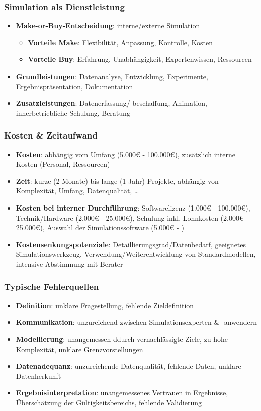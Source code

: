 \documentclass{article}
\begin{document}
\subsubsection{Simulation als Dienstleistung}
\begin{itemize}
  \item \textbf{Make-or-Buy-Entscheidung}: interne/externe Simulation
        \begin{itemize}
          \item \textbf{Vorteile Make}: Flexibilität, Anpassung, Kontrolle, Kosten
          \item \textbf{Vorteile Buy}: Erfahrung, Unabhängigkeit, Expertenwissen, Ressourcen
        \end{itemize}
  \item \textbf{Grundleistungen}: Datenanalyse, Entwicklung, Experimente, Ergebnispräsentation, Dokumentation
  \item \textbf{Zusatzleistungen}: Datenerfassung/-beschaffung, Animation, innerbetriebliche Schulung, Beratung
\end{itemize}

\subsubsection{Kosten \& Zeitaufwand}
\begin{itemize}
  \item \textbf{Kosten}: abhängig vom Umfang (5.000€ - 100.000€), zusätzlich interne Kosten (Personal, Ressourcen)
  \item \textbf{Zeit}: kurze (2 Monate) bis lange (1 Jahr) Projekte, abhängig von Komplexität, Umfang, Datenqualität, …
  \item \textbf{Kosten bei interner Durchführung}: Softwarelizenz (1.000€ - 100.000€), Technik/Hardware (2.000€ - 25.000€), Schulung inkl. Lohnkosten (2.000€ - 25.000€), Auswahl der Simulationssoftware (5.000€ - )
  \item \textbf{Kostensenkungspotenziale}: Detaillierungsgrad/Datenbedarf, geeignetes Simulationswerkzeug, Verwendung/Weiterentwicklung von Standardmodellen, intensive Abstimmung mit Berater
\end{itemize}

\subsubsection{Typische Fehlerquellen}
\begin{itemize}
  \item \textbf{Definition}: unklare Fragestellung, fehlende Zieldefinition
  \item \textbf{Kommunikation}: unzureichend zwischen Simulationsexperten \& -anwendern
  \item \textbf{Modellierung}: unangemessen ddurch vernachlässigte Ziele, zu hohe Komplexität, unklare Grenzvorstellungen
  \item \textbf{Datenadequanz}: unzureichende Datenqualität, fehlende Daten, unklare Datenherkunft
  \item \textbf{Ergebnisinterpretation}: unangemessenes Vertrauen in Ergebnisse, Überschätzung der Gültigkeitsbereichs, fehlende Validierung
\end{itemize}
\end{document}
